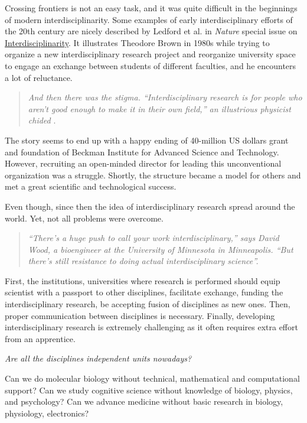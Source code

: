 \documentclass[12pt,]{book}
\theoremstyle{definition}
\theoremstyle{definition}
\theoremstyle{definition}
\theoremstyle{remark}
\begin{document}
Crossing frontiers is not an easy task, and it was quite difficult in
the beginnings of modern interdisciplinarity. Some examples of early
interdisciplinary efforts of the 20th century are nicely described by
Ledford et al. \citep{Ledford2015} in \emph{Nature} special issue on
\href{https://www.nature.com/news/interdisciplinarity-1.18295}{Interdisciplinarity}.
It illustrates Theodore Brown in 1980s while trying to organize a new
interdisciplinary research project and reorganize university space to
engage an exchange between students of different faculties, and he
encounters a lot of reluctance.

\begin{quote}
\emph{And then there was the stigma. ``Interdisciplinary research is for
people who aren't good enough to make it in their own field,'' an
illustrious physicist chided} \citep{Ledford2015}.
\end{quote}

The story seems to end up with a happy ending of 40-million US dollars
grant and foundation of Beckman Institute for Advanced Science and
Technology. However, recruiting an open-minded director for leading this
unconventional organization was a struggle. Shortly, the structure
became a model for others and met a great scientific and technological
success.

Even though, since then the idea of interdisciplinary research spread
around the world. Yet, not all problems were overcome.

\begin{quote}
\emph{``There's a huge push to call your work interdisciplinary,'' says
David Wood, a bioengineer at the University of Minnesota in Minneapolis.
``But there's still resistance to doing actual interdisciplinary
science''.}
\end{quote}

First, the institutions, universities where research is performed should
equip scientist with a passport to other disciplines, facilitate
exchange, funding the interdisciplinary research, be accepting fusion of
disciplines as new ones. Then, proper communication between disciplines
is necessary. Finally, developing interdisciplinary research is
extremely challenging as it often requires extra effort from an
apprentice.

\emph{Are all the disciplines independent units nowadays?}

Can we do molecular biology without technical, mathematical and
computational support? Can we study cognitive science without knowledge
of biology, physics, and psychology? Can we advance medicine without
basic research in biology, physiology, electronics?
\end{document}
